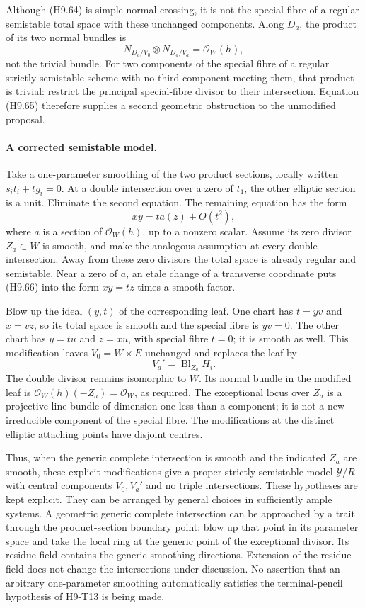 Although (H9.64) is simple normal crossing, it is not the special
fibre of a regular semistable total space with these unchanged
components. Along $D_a$, the product of its two normal bundles is
\[
 N_{D_a/V_0}\otimes N_{D_a/V_a}=\mathcal O_W(h),             \tag{H9.65}
\]
not the trivial bundle. For two components of the special fibre of
a regular strictly semistable scheme with no third component
meeting them, that product is trivial: restrict the principal
special-fibre divisor to their intersection. Equation (H9.65)
therefore supplies a second geometric obstruction to the unmodified
proposal.

\paragraph{A corrected semistable model.}
Take a one-parameter smoothing of the two product sections,
locally written $s_i t_i+t g_i=0$. At a double intersection over a
zero of $t_1$, the other elliptic section is a unit. Eliminate the
second equation. The remaining equation has the form
\[
                         xy=t a(z)+O(t^2),                 \tag{H9.66}
\]
where $a$ is a section of $\mathcal O_W(h)$, up to a nonzero scalar.
Assume its zero divisor $Z_a\subset W$ is smooth, and make the
analogous assumption at every double intersection. Away from these
zero divisors the total space is already regular and semistable.
Near a zero of $a$, an etale change of a transverse coordinate puts
(H9.66) into the form $xy=tz$ times a smooth factor.

Blow up the ideal $(y,t)$ of the corresponding leaf. One chart has
$t=yv$ and $x=vz$, so its total space is smooth and the special
fibre is $yv=0$. The other chart has $y=tu$ and $z=xu$, with
special fibre $t=0$; it is smooth as well. This modification leaves
$V_0=W\times E$ unchanged and replaces the leaf by
\[
                    V_a'=\operatorname{Bl}_{Z_a}H_i.
                                                               \tag{H9.67}
\]
The double divisor remains isomorphic to $W$. Its normal bundle in
the modified leaf is
$\mathcal O_W(h)(-Z_a)=\mathcal O_W$, as required. The exceptional
locus over $Z_a$ is a projective line bundle of dimension one less
than a component; it is not a new irreducible component of the
special fibre. The modifications at the distinct elliptic attaching
points have disjoint centres.

Thus, when the generic complete intersection is smooth and the
indicated $Z_a$ are smooth, these explicit modifications give a
proper strictly semistable model $\mathcal Y/R$ with central
components $V_0,V_a'$ and no triple intersections. These hypotheses
are kept explicit. They can be arranged by general choices in
sufficiently ample systems. A geometric generic complete intersection
can be approached by a trait through the product-section boundary
point: blow up that point in its parameter space and take the local
ring at the generic point of the exceptional divisor. Its residue
field contains the generic smoothing directions. Extension of the
residue field does not change the intersections under discussion.
No assertion that an arbitrary one-parameter smoothing automatically
satisfies the terminal-pencil hypothesis of H9-T13 is being made.

